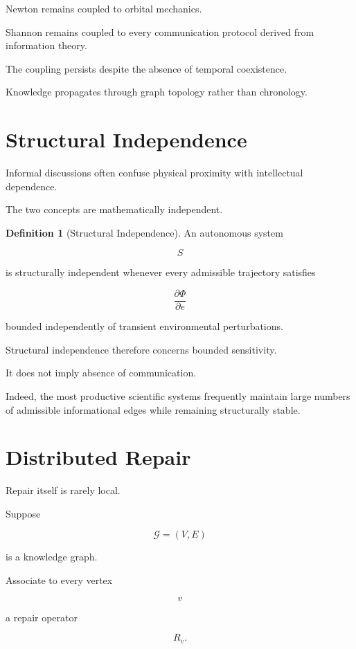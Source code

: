 \documentclass[11pt,oneside]{book}
\numberwithin{equation}{chapter}
\theoremstyle{definition}
\newtheorem{definition}{Definition}[chapter]
\theoremstyle{plain}
\begin{document}
Newton remains coupled to orbital mechanics.

Shannon remains coupled to every communication protocol derived from
information theory.

The coupling persists despite the absence of temporal coexistence.

Knowledge propagates through graph topology rather than chronology.

\section{Structural Independence}

Informal discussions often confuse physical proximity with intellectual
dependence.

The two concepts are mathematically independent.

\begin{definition}[Structural Independence]

An autonomous system

\[
S
\]

is structurally independent whenever every admissible trajectory satisfies

\[
\frac{\partial\Phi}{\partial e}
\]

bounded independently of transient environmental perturbations.

\end{definition}

Structural independence therefore concerns bounded sensitivity.

It does not imply absence of communication.

Indeed, the most productive scientific systems frequently maintain large
numbers of admissible informational edges while remaining structurally
stable.

\section{Distributed Repair}

Repair itself is rarely local.

Suppose

\[
\mathcal{G}
=
(V,E)
\]

is a knowledge graph.

Associate to every vertex

\[
v
\]

a repair operator

\[
R_v.
\]
\end{document}
